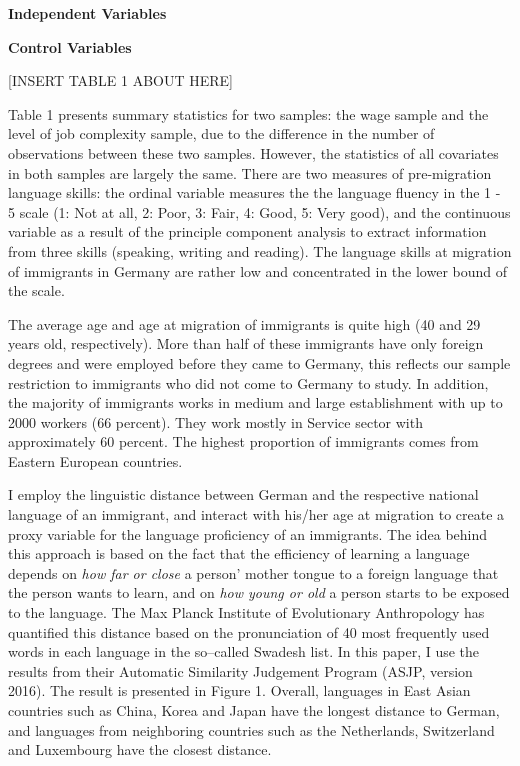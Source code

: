 \documentclass[12pt,a4paper]{article}
\begin{document}
\textbf{Independent Variables}

\textbf{Control Variables}

\begin{center}
[INSERT TABLE 1 ABOUT HERE]
\end{center}

Table 1 presents summary statistics for two samples: the wage sample and the level of job complexity sample, due to the difference in the number of observations between these two samples. However, the statistics of all covariates in both samples are largely the same.  There are two measures of pre-migration language skills: the ordinal variable measures the the language fluency in the 1 - 5 scale (1: Not at all, 2: Poor, 3: Fair, 4: Good, 5: Very good), and the continuous variable as a result of the principle component analysis to extract information from three skills (speaking, writing and reading). The language skills at migration of immigrants in Germany are rather low and concentrated in the lower bound of the scale.

The average age and age at migration of immigrants is quite high (40 and 29 years old, respectively). More than half of these immigrants have only foreign degrees and were employed before they came to Germany, this reflects our sample restriction to immigrants who did not come to Germany to study. In addition, the majority of immigrants works in medium and large establishment with up to 2000 workers (66 percent). They work mostly in Service sector with approximately 60 percent. The highest proportion of immigrants comes from Eastern European countries.

I employ the linguistic distance between German and the respective national language of an immigrant, and interact with his/her age at migration to create a proxy variable for the language proficiency of an immigrants. The idea behind this approach is based on the fact that the efficiency of learning a language depends on \textit{how far or close} a person' mother tongue to a foreign language that the person wants to learn, and on \textit{how young or old} a person starts to be exposed to the language. The Max Planck Institute of Evolutionary Anthropology has quantified this distance based on the pronunciation of 40 most frequently used words in each language in the so--called Swadesh list. In this paper, I use the results from their Automatic Similarity Judgement Program (ASJP, version 2016). The result is presented in Figure 1. Overall, languages in East Asian countries such as China, Korea and Japan have the longest distance to German, and languages from neighboring countries such as the Netherlands, Switzerland and Luxembourg have the closest distance.
\end{document}
